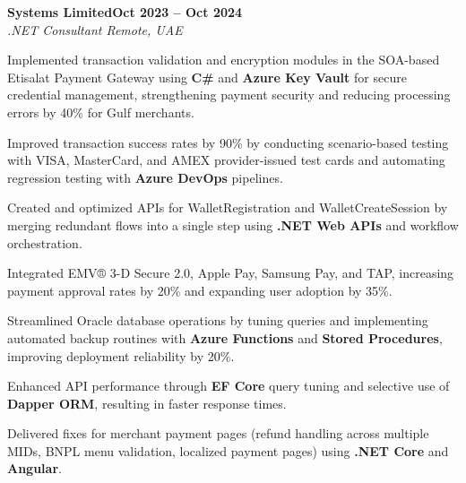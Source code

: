 \documentclass[letterpaper,10pt]{article}
\newcommand{\headingBf}[2]{
  \hspace{10pt}\textbf{#1}\hfill\textbf{#2}\\
}
\newcommand{\headingIt}[2]{
  \hspace{10pt}\textit{#1}\hfill\textit{#2}\\
}
\newenvironment{resume_list}{
  \vspace{-7pt}
  \begin{itemize}[itemsep=-2px, parsep=1pt, leftmargin=30pt]
}{
  \end{itemize}
}
\begin{document}
\headingBf{Systems Limited}{Oct 2023 -- Oct 2024}
\headingIt{.NET Consultant \hfill Remote, UAE}{}
\begin{resume_list}
    \item Implemented transaction validation and encryption modules in the SOA-based Etisalat Payment Gateway using \textbf{C\#} and \textbf{Azure Key Vault} for secure credential management, strengthening payment security and reducing processing errors by 40\% for Gulf merchants.
    \item Improved transaction success rates by 90\% by conducting scenario-based testing with VISA, MasterCard, and AMEX provider-issued test cards and automating regression testing with \textbf{Azure DevOps} pipelines.
    \item Created and optimized APIs for WalletRegistration and WalletCreateSession by merging redundant flows into a single step using \textbf{.NET Web APIs} and workflow orchestration.
    \item Integrated EMV® 3-D Secure 2.0, Apple Pay, Samsung Pay, and TAP, increasing payment approval rates by 20\% and expanding user adoption by 35\%.
    \item Streamlined Oracle database operations by tuning queries and implementing automated backup routines with \textbf{Azure Functions} and \textbf{Stored Procedures}, improving deployment reliability by 20\%.
    \item Enhanced API performance through \textbf{EF Core} query tuning and selective use of \textbf{Dapper ORM}, resulting in faster response times.
    \item Delivered fixes for merchant payment pages (refund handling across multiple MIDs, BNPL menu validation, localized payment pages) using \textbf{.NET Core} and \textbf{Angular}.
\end{resume_list}
\end{document}
